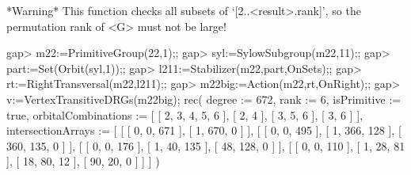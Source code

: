 *Warning* This function checks all subsets of `[2..<result>.rank]', so
the permutation rank of <G> must not be large!

\beginexample
gap> m22:=PrimitiveGroup(22,1);;
gap> syl:=SylowSubgroup(m22,11);;
gap> part:=Set(Orbit(syl,1));;
gap> l211:=Stabilizer(m22,part,OnSets);;
gap> rt:=RightTransversal(m22,l211);;
gap> m22big:=Action(m22,rt,OnRight);;
gap> v:=VertexTransitiveDRGs(m22big);
rec( degree := 672, rank := 6, isPrimitive := true, 
  orbitalCombinations := [ [ 2, 3, 4, 5, 6 ], [ 2, 4 ], [ 3, 5, 6 ], [ 3, 6 ] 
     ], 
  intersectionArrays := [ [ [ 0, 0, 671 ], [ 1, 670, 0 ] ], [ [ 0, 0, 495 ], 
          [ 1, 366, 128 ], [ 360, 135, 0 ] ], 
      [ [ 0, 0, 176 ], [ 1, 40, 135 ], [ 48, 128, 0 ] ], 
      [ [ 0, 0, 110 ], [ 1, 28, 81 ], [ 18, 80, 12 ], [ 90, 20, 0 ] ] ] )
\endexample
